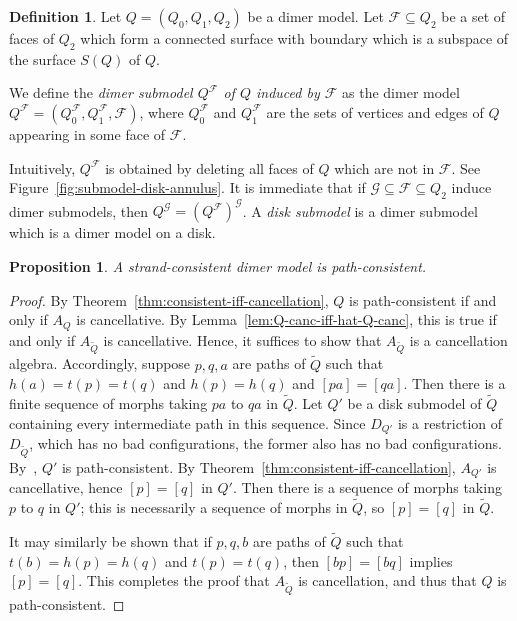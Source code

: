 \documentclass{article}
\newtheorem{prop}[thm]{Proposition}
\theoremstyle{definition}
\newtheorem{defn}[thm]{Definition}
\begin{document}
\begin{defn}\label{defn:dimer-submodel}
	Let $Q=(Q_0,Q_1,Q_2)$ be a dimer model. Let $\mathcal F\subseteq Q_2$ be a set of faces of $Q_2$ which form a connected surface with boundary which is a subspace of the surface $S(Q)$ of $Q$.  

	We define the \textit{dimer submodel $Q^\mathcal F$ of $Q$ induced by $\mathcal F$} as the dimer model $Q^\mathcal F=(Q^\mathcal F_0,Q^\mathcal F_1,\mathcal F)$, where $Q^\mathcal F_0$ and $Q^\mathcal F_1$ are the sets of vertices and edges of $Q$ appearing in some face of $\mathcal F$.
\end{defn}

Intuitively, $Q^\mathcal F$ is obtained by deleting all faces of $Q$ which are not in $\mathcal F$. See Figure~\ref{fig:submodel-disk-annulus}. It is immediate that if $\mathcal G\subseteq\mathcal F\subseteq Q_2$ induce dimer submodels, then $Q^\mathcal G=(Q^\mathcal F)^\mathcal G$. A \textit{disk submodel} is a dimer submodel which is a dimer model on a disk.


\begin{prop}\label{thm:not-a-cons-then-not-g-conss}
	A strand-consistent dimer model is path-consistent.
\end{prop}
\begin{proof}
	By Theorem~\ref{thm:consistent-iff-cancellation}, $Q$ is path-consistent if and only if $A_Q$ is cancellative. By Lemma~\ref{lem:Q-canc-iff-hat-Q-canc}, this is true if and only if $A_{\widetilde Q}$ is cancellative. Hence, it suffices to show that $A_{\widetilde Q}$ is a cancellation algebra.
	Accordingly, suppose $p,q,a$ are paths of $\widetilde Q$ such that $h(a)=t(p)=t(q)$ and $h(p)=h(q)$ and $[pa]=[qa]$. Then there is a finite sequence of morphs taking $pa$ to $qa$ in $\widetilde Q$. Let $Q'$ be a disk submodel of $\widetilde Q$ containing every intermediate path in this sequence. Since $D_{Q'}$ is a restriction of $D_{\widetilde Q}$, which has no bad configurations, the former also has no bad configurations. By~\cite[Proposition 2.15]{CKP}, $Q'$ is path-consistent. By Theorem~\ref{thm:consistent-iff-cancellation}, $A_{Q'}$ is cancellative, hence $[p]=[q]$ in $Q'$. Then there is a sequence of morphs taking $p$ to $q$ in $Q'$; this is necessarily a sequence of morphs in $\widetilde Q$, so $[p]=[q]$ in $\widetilde Q$.

	It may similarly be shown that if $p,q,b$ are paths of $\widetilde Q$ such that $t(b)=h(p)=h(q)$ and $t(p)=t(q)$, then $[bp]=[bq]$ implies $[p]=[q]$. This completes the proof that $A_{\widetilde Q}$ is cancellation, and thus that $Q$ is path-consistent.
\end{proof}
\end{document}

